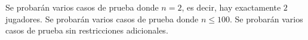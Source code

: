 \documentclass{oci}
\begin{document}
\begin{scoreDescription}
   Se probarán varios casos de prueba donde $n = 2$, es decir, hay exactamente $2$ jugadores.
   Se probarán varios casos de prueba donde $n \leq 100$.
   Se probarán varios casos de prueba sin restricciones adicionales.
\end{scoreDescription}

\begin{sampleDescription}
\end{sampleDescription}
\end{document}
